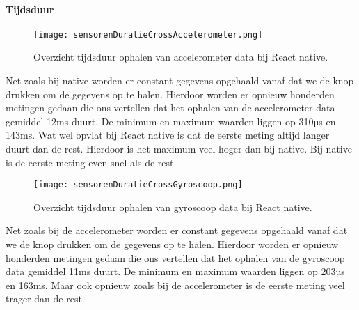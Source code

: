 \paragraph{Tijdsduur}
\begin{figure}[H]
    \centering
    \texttt{[image: sensorenDuratieCrossAccelerometer.png]}
    \caption{Overzicht tijdsduur ophalen van accelerometer data bij React native.}
\end{figure}
Net zoals bij native worden er constant gegevens opgehaald vanaf dat we de knop drukken om de
gegevens op te halen. Hierdoor worden er opnieuw honderden metingen gedaan die ons vertellen dat het ophalen
van de accelerometer data gemiddel 12ms duurt. De minimum en maximum waarden liggen op 310µs en 143ms.
Wat wel opvlat bij React native is dat de eerste meting altijd langer duurt dan de rest. 
Hierdoor is het maximum veel hoger dan bij native. Bij native is de eerste meting even snel als de rest. 
\begin{figure}[H]
    \centering
    \texttt{[image: sensorenDuratieCrossGyroscoop.png]}
    \caption{Overzicht tijdsduur ophalen van gyroscoop data bij React native.}
\end{figure}
Net zoals bij de accelerometer worden er constant gegevens opgehaald vanaf dat we de knop drukken om de 
gegevens op te halen. Hierdoor worden er opnieuw honderden metingen gedaan die ons vertellen dat het ophalen
van de gyroscoop data gemiddel 11ms duurt. De minimum en maximum waarden liggen op 203µs en 163ms.
Maar ook opnieuw zoals bij de accelerometer is de eerste meting veel trager dan de rest.

